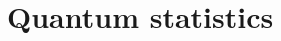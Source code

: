 \documentclass[letter-paper]{tufte-book}
\begin{document}

\chapter{Quantum statistics}










\mainmatter




%


\end{document}

